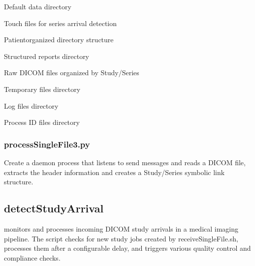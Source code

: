 \documentclass[letterpaper,10pt,english]{sphinxmanual}
\begin{document}
\sphinxAtStartPar
{}

\begin{DUlineblock}{0em}
\item[] \sphinxhyphen{}  \sphinxhyphen{} Default data directory
\item[] \sphinxhyphen{}  \sphinxhyphen{} Touch files for series arrival detection
\item[] \sphinxhyphen{}  \sphinxhyphen{} Patient\sphinxhyphen{}organized directory structure
\item[] \sphinxhyphen{}  \sphinxhyphen{} Structured reports directory
\item[] \sphinxhyphen{}  \sphinxhyphen{} Raw DICOM files organized by Study/Series
\item[] \sphinxhyphen{}  \sphinxhyphen{} Temporary files directory
\item[] \sphinxhyphen{}  \sphinxhyphen{} Log files directory
\item[] \sphinxhyphen{}  \sphinxhyphen{} Process ID files directory
\end{DUlineblock}


\subsubsection{processSingleFile3.py}
\label{\detokenize{Architecture/scripts/processSingleFile3:id1}}
\sphinxAtStartPar
Create a daemon process that listens to send messages and reads a DICOM file,
extracts the header information and creates a Study/Series symbolic link structure.
\begin{description}
\sphinxAtStartPar
{}

\end{description}

\sphinxstepscope


\subsection{detectStudyArrival}
\label{\detokenize{Architecture/scripts/detectStudyArrival:detectstudyarrival}}\label{\detokenize{Architecture/scripts/detectStudyArrival::doc}}
\sphinxAtStartPar
{} monitors and processes incoming DICOM study arrivals in a medical imaging pipeline. The script checks for new study jobs created by receiveSingleFile.sh, processes them after a configurable delay, and triggers various quality control and compliance checks.
\end{document}
